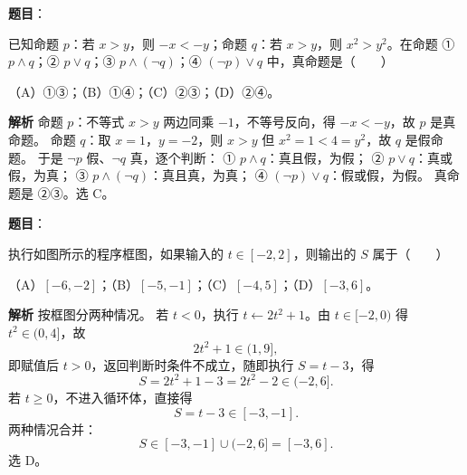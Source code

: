 \begin{answer}

\textbf{题目}：

已知命题 $p$：若 $x>y$，则 $-x<-y$；命题 $q$：若 $x>y$，则 $x^2>y^2$。在命题 ① $p\wedge q$；② $p\vee q$；③ $p\wedge(\neg q)$；④ $(\neg p)\vee q$ 中，真命题是\mbox{（　　）}

（A）①③；（B）①④；（C）②③；（D）②④。

\textbf{解析}
命题 $p$：不等式 $x>y$ 两边同乘 $-1$，不等号反向，得 $-x<-y$，故 $p$ 是真命题。
命题 $q$：取 $x=1$，$y=-2$，则 $x>y$ 但 $x^2=1<4=y^2$，故 $q$ 是假命题。
于是 $\neg p$ 假、$\neg q$ 真，逐个判断：
① $p\wedge q$：真且假，为假；
② $p\vee q$：真或假，为真；
③ $p\wedge(\neg q)$：真且真，为真；
④ $(\neg p)\vee q$：假或假，为假。
真命题是 ②③。选 C。


\end{answer}
\begin{answer}

\textbf{题目}：

执行如图所示的程序框图，如果输入的 $t\in[-2,2]$，则输出的 $S$ 属于\mbox{（　　）}
\nopagebreak[4]
\begin{center}\end{center}
\nopagebreak[4]
（A）$[-6,-2]$；（B）$[-5,-1]$；（C）$[-4,5]$；（D）$[-3,6]$。

\textbf{解析}
按框图分两种情况。
若 $t<0$，执行 $t\leftarrow2t^2+1$。由 $t\in[-2,0)$ 得 $t^2\in(0,4]$，故
\nopagebreak[4]
\[2t^2+1\in(1,9],\]
即赋值后 $t>0$，返回判断时条件不成立，随即执行 $S=t-3$，得
\nopagebreak[4]
\[S=2t^2+1-3=2t^2-2\in(-2,6].\]
若 $t\geqslant0$，不进入循环体，直接得
\nopagebreak[4]
\[S=t-3\in[-3,-1].\]
两种情况合并：
\nopagebreak[4]
\[S\in[-3,-1]\cup(-2,6]=[-3,6].\]
选 D。

\gkanswer{答案：D。$t<0$ 时先化为 $t=2t^2+1\in(1,9]$，再得 $S=t-3\in(-2,6]$；$t\geqslant0$ 时 $S=t-3\in[-3,-1]$，合并得 $[-3,6]$。}

\end{answer}

